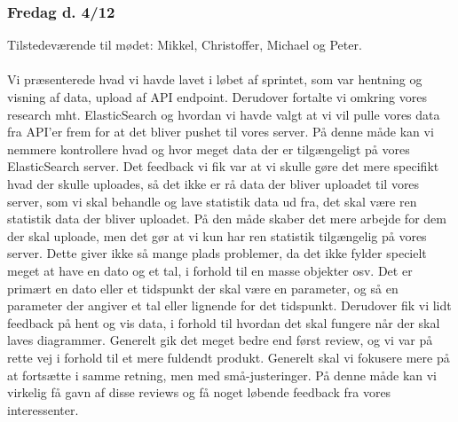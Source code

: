 \subsubsection{Fredag d. 4/12}
Tilstedeværende til mødet: Mikkel, Christoffer, Michael og Peter.
\\\\
Vi præsenterede hvad vi havde lavet i løbet af sprintet, som var hentning og visning af data, upload af API endpoint. Derudover fortalte vi omkring vores research mht. ElasticSearch og hvordan vi havde valgt at vi vil pulle vores data fra API'er frem for at det bliver pushet til vores server. På denne måde kan vi nemmere kontrollere hvad og hvor meget data der er tilgængeligt på vores ElasticSearch server.
Det feedback vi fik var at vi skulle gøre det mere specifikt hvad der skulle uploades, så det ikke er rå data der bliver uploadet til vores server, som vi skal behandle og lave statistik data ud fra, det skal være ren statistik data der bliver uploadet. På den måde skaber det mere arbejde for dem der skal uploade, men det gør at vi kun har ren statistik tilgængelig på vores server. Dette giver ikke så mange plads problemer, da det ikke fylder specielt meget at have en dato og et tal, i forhold til en masse objekter osv. Det er primært en dato eller et tidspunkt der skal være en parameter, og så en parameter der angiver et tal eller lignende for det tidspunkt.
Derudover fik vi lidt feedback på hent og vis data, i forhold til hvordan det skal fungere når der skal laves diagrammer.
Generelt gik det meget bedre end først review, og vi var på rette vej i forhold til et mere fuldendt produkt. Generelt skal vi fokusere mere på at fortsætte i samme retning, men med små-justeringer. På denne måde kan vi virkelig få gavn af disse reviews og få noget løbende feedback fra vores interessenter.
